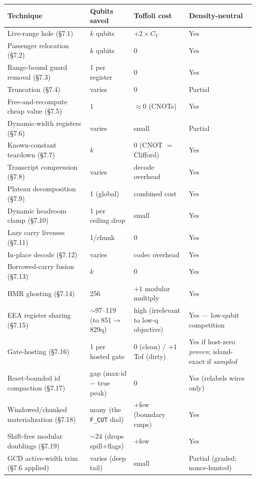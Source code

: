 \documentclass[11pt,a4paper]{article}
\begin{document}
\begin{center}
\small
\begin{tabular}{p{4.8cm}p{3cm}p{2.8cm}p{2.5cm}}
\toprule
\textbf{Technique} & \textbf{Qubits saved} & \textbf{Toffoli cost} & \textbf{Density-neutral} \\
\midrule
Live-range hole (\S7.1) & $k$ qubits & $+2 \times C_V$ & Yes \\
Passenger relocation (\S7.2) & $k$ qubits & 0 & Yes \\
Range-bound guard removal (\S7.3) & 1 per register & 0 & Yes \\
Truncation (\S7.4) & varies & 0 & Partial \\
Free-and-recompute cheap value (\S7.5) & 1 & $\approx0$ (CNOTs) & Yes \\
Dynamic-width registers (\S7.6) & varies & small & Partial \\
Known-constant teardown (\S7.7) & $k$ & 0 (CNOT $=$ Clifford) & Yes \\
Transcript compression (\S7.8) & varies & decode overhead & Yes \\
Plateau decomposition (\S7.9) & 1 (global) & combined cost & Yes \\
Dynamic headroom clamp (\S7.10) & 1 per ceiling drop & small & Yes \\
Lazy carry liveness (\S7.11) & 1/chunk & 0 & Yes \\
In-place decode (\S7.12) & varies & codec overhead & Yes \\
Borrowed-carry fusion (\S7.13) & $k$ & 0 & Yes \\
HMR ghosting (\S7.14) & 256 & $+1$ modular multiply & Yes \\
EEA register sharing (\S7.15) & $\sim$97--119 (to 851$\to$829q) & high (irrelevant to low-q objective) & Yes --- low-qubit competition \\
Gate-hosting (\S7.16) & 1 per hosted gate & 0 (clean) / $+1$ Tof (dirty) & Yes if host-zero \emph{proven}; island-exact if \emph{sampled} \\
Reset-bounded id compaction (\S7.17) & gap (max-id $-$ true peak) & 0 & Yes (relabels wires only) \\
Windowed/chunked materialization (\S7.18) & many (the \texttt{F\_CUT} dial) & $+$few (boundary cmps) & Yes \\
Shift-free modular doublings (\S7.19) & $\sim$24 (drops spill$+$flags) & $+$few & Yes \\
GCD active-width trim (\S7.6 applied) & varies (deep tail) & small & Partial (graded; nonce-hunted) \\
\bottomrule
\end{tabular}
\end{center}
\end{document}
